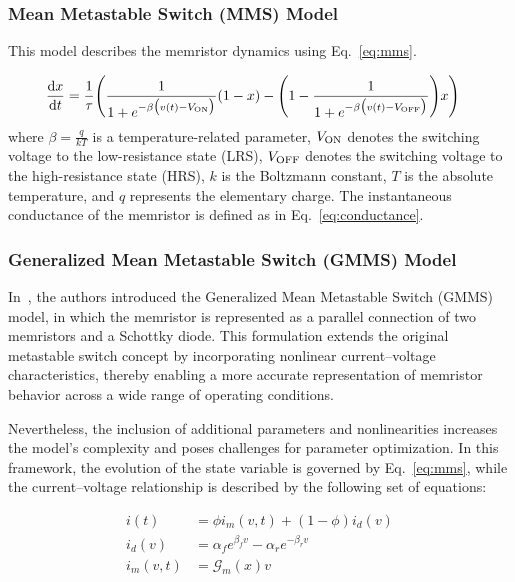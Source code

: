 \documentclass[11pt, oneside]{article}
\newcommand{\G}{\mathcal{G}}
\newcommand{\von}{V_{\rm ON}}
\newcommand{\voff}{V_{\rm OFF}}
\newcommand{\ua}{v}
\newcommand{\dert}[1]{\frac{{\rm d} {#1}}{{\rm d} t} }
\begin{document}
\subsubsection{Mean Metastable Switch (MMS) Model}

This model describes the memristor dynamics using Eq.~\eqref{eq:mms}.


\begin{align}
    \label{eq:mms}
    \dert{x} & =  \frac{1}{\tau} \Bigg( \frac{1}{1+e^{-\beta \big(\ua(t)-\von\big)}} (1-x)  -\Bigg(1- \frac{1}{1+e^{-\beta \big(\ua(t)-\voff\big)}} \Bigg) x \Bigg)
\end{align}
where \(\beta= \frac{q}{kT}\) is a temperature-related parameter, \(\von\) denotes the switching voltage to the low-resistance state (LRS), \(\voff\) denotes the switching voltage to the high-resistance state (HRS), \(k\) is the Boltzmann constant, \(T\) is the absolute temperature, and \(q\) represents the elementary charge. The instantaneous conductance of the memristor is defined as in Eq.~\eqref{eq:conductance}.

\subsubsection{Generalized Mean Metastable Switch (GMMS) Model}

In~\cite{Molter2016}, the authors introduced the Generalized Mean Metastable Switch (GMMS) model, in which the memristor is represented as a parallel connection of two memristors and a Schottky diode. This formulation extends the original metastable switch concept by incorporating nonlinear current--voltage characteristics, thereby enabling a more accurate representation of memristor behavior across a wide range of operating conditions.

Nevertheless, the inclusion of additional parameters and nonlinearities increases the model's complexity and poses challenges for parameter optimization. In this framework, the evolution of the state variable is governed by Eq.~\eqref{eq:mms}, while the current--voltage relationship is described by the following set of equations:


\begin{align}
    i(t)      & = \phi i_m(v, t) + (1-\phi) i_d(v)                 \\
    i_d(v)    & = \alpha_f e^{\beta_f v} - \alpha_r e^{-\beta_r v} \\
    i_m(v, t) & = \G_m(x) v
    \label{eq:gmms}
\end{align}
\end{document}
